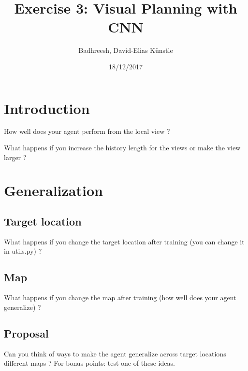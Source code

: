 \documentclass[a4paper,14pt]{article}
\begin{document}
\title{Exercise 3: Visual Planning with CNN}
\author{Badhreesh, David-Elias K\"unstle}
\date{18/12/2017}
\maketitle
\section{Introduction}


How well does your agent perform from the local view ?

What happens if you increase the history length for the views or make the
view larger ?

\section{Generalization}
\subsection{Target location}
What happens if you change the target location after training (you can
change it in utils.py) ?

\subsection{Map}
What happens if you change the map after training (how well does your
agent generalize) ?

\subsection{Proposal}
Can you think of ways to make the agent generalize across target locations
different maps ? For bonus points: test one of these ideas.


\end{document}
